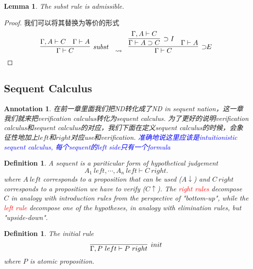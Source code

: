\documentclass{article}
\theoremstyle{plain}
\newtheorem{lemma}[theorem]{Lemma}
\newtheorem{definition}[theorem]{Definition}
\newtheorem{annotation}[theorem]{Annotation}
\theoremstyle{nonumberplain}
\newtheorem{proof}{Proof}
\newcommand{\redt}[1]{\textcolor{red}{#1}}
\newcommand{\bluet}[1]{\textcolor{blue}{#1}}
\begin{document}
\begin{lemma}
\rm The \emph{subst} rule is admissible.
\end{lemma}

\begin{proof}
我们可以将其替换为等价的形式
$$
\infer[subst]{\Gamma \vdash C}{\Gamma, A \vdash C & \Gamma \vdash A} ~~\leadsto ~~ \infer[\supset\!\!E]{\Gamma \vdash C}{\infer[\supset I]{\Gamma \vdash A \supset C}{\Gamma, A \vdash C} & \Gamma \vdash A}
$$
\end{proof}



\newpage
\subsection{Sequent Calculus}

\begin{annotation}
\rm 在前一章里面我们把ND转化成了ND in sequent nation，这一章我们就来把verification calculus转化为sequent calculus. 为了更好的说明verification calculus和sequent calculus的对应，我们下面在定义sequent calculus的时候，会象征性地加上$left$和$right$对应use和verification. \bluet{准确地说这里应该是intuitionistic sequent calculus, 每个sequent的left side只有一个formula}
\end{annotation}


\begin{definition}
\rm A sequent is a pariticular form of hypothetical judgement
$$
A_1~left,\cdots,A_n~left \vdash C~right. 
$$
where $A~left$ corresponds to a proposition that can be used ($A\downarrow$) and $C~right$ corresponds to a proposition we have to verify ($C \uparrow$). The \redt{right rules} decompose $C$ in analogy with introduction rules from the perspective of "bottom-up",  while the \redt{left rule} decompose one of the hypotheses, in analogy with elimination rules, but "upside-down". 
\end{definition}



\begin{definition}
\rm The initial rule
$$
\infer[init]{\Gamma, P~left \vdash P~right}{}
$$
where $P$ is atomic proposition. 
\end{definition}
\end{document}
